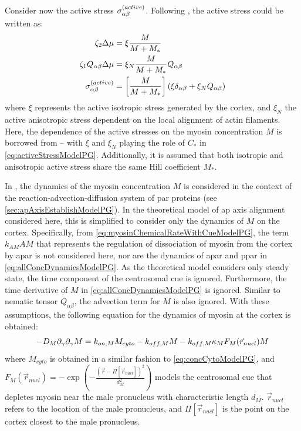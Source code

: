 Consider now the active stress $\sigma^{(active)}_{\alpha\beta}$. Following \cite{gross2019guiding}, the active stress could be written as:
\begin{align}
    \zeta_2 \Delta\mu &= \xi \frac{M}{M + M_*} \\
    \zeta_1 Q_{\alpha\beta}\Delta\mu &= \xi_N \frac{M}{M + M_*} Q_{\alpha\beta}\\
    \sigma^{(active)}_{\alpha\beta} &= \left[\frac{M}{M + M_*}\right](\xi\delta_{\alpha\beta} + \xi_N Q_{\alpha\beta})
\end{align}
where $\xi$ represents the active isotropic stress generated by the cortex, and $\xi_N$ the active anisotropic stress dependent on the local alignment of actin filaments. Here, the dependence of the active stresses on the myosin concentration $M$ is borrowed from \cite{gross2019guiding} -- with $\xi$ and $\xi_N$ playing the role of $C_*$ in \autoref{eq:activeStressModelPG}. Additionally, it is assumed that both isotropic and anisotropic active stress share the same Hill coefficient $M_*$.

In \cite{gross2019guiding}, the dynamics of the myosin concentration $M$ is considered in the context of the reaction-advection-diffusion system of \ac{par} proteins (see \autoref{sec:apAxisEstablishModelPG}). In the theoretical model of \ac{ap} axis alignment considered here, this is simplified to consider only the dynamics of $M$ on the cortex. Specifically, from \autoref{eq:myosinChemicalRateWithCueModelPG}, the term $k_{AM}AM$ that represents the regulation of dissociation of myosin from the cortex by \ac{apar} is not considered here, nor are the dynamics of \ac{apar} and \ac{ppar} in \autoref{eq:allConcDynamicsModelPG}. As the theoretical model considers only steady state, the time component of the centrosomal cue is ignored. Furthermore, the time derivative of $M$ in \autoref{eq:allConcDynamicsModelPG} is ignored. Similar to nematic tensor $Q_{\alpha\beta}$, the advection term for $M$ is also ignored. With these assumptions, the following equation for the dynamics of myosin at the cortex is obtained:
\begin{equation}\label{eq:dynamicsMyosinBulkModelMN}
    -D_M\inlinePartial{\gamma}{\inlinePartial{\gamma}{M}} = k_{on,M}M_{cyto} - k_{off,M}M - k_{off,M}\kappa_MF_M(\vec{r}_{nucl})M
\end{equation}
where $M_{cyto}$ is obtained in a similar fashion to \autoref{eq:concCytoModelPG}, and \\$F_M(\vec{r}_{nucl}) = -\exp(-\frac{\left(\vec{r} - \Pi[\vec{r}_{nucl}]\right)^2}{d_M^2})$ models the centrosomal cue that depletes myosin near the male pronucleus with characteristic length $d_M$. $\vec{r}_{nucl}$ refers to the location of the male pronucleus, and $\Pi[\vec{r}_{nucl}]$ is the point on the cortex closest to the male pronucleus.

